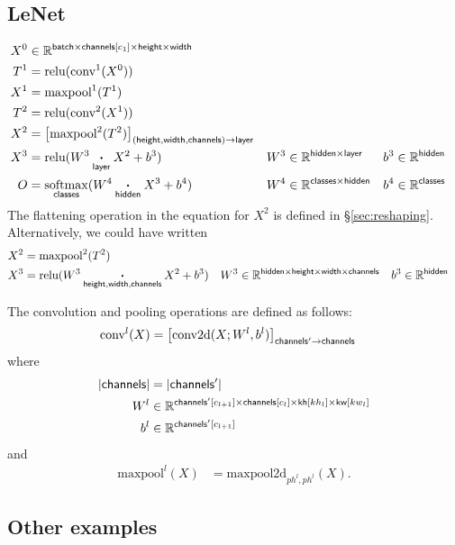 \documentclass{article}
\newcommand{\reals}{\mathbb{R}}
\begin{document}
\subsection{LeNet}

\begin{align*}
X^0 &\in \reals^{\name{batch} \times \nset{channels}{c_1} \times \name{height} \times \name{width}} \\
T^1 &= \text{relu}(\text{conv}^1(X^0)) \\
X^1 &= \text{maxpool}^1(T^1) \\
T^2 &= \text{relu}(\text{conv}^2(X^1)) \\
X^2 &= \nmov{(height,width,channels)}{layer}{\text{maxpool}^2(T^2)} \\
X^3 &= \text{relu}(W^3 \ndot{layer} X^2 + b^3) & W^3 &\in \mathbb{R}^{\name{hidden} \times \name{layer}} & b^3 &\in \mathbb{R}^{\name{hidden}} \\
O &= \nfun{classes}{softmax} (W^4 \ndot{hidden} X^3 + b^4) & W^4 &\in \mathbb{R}^{\name{classes} \times \name{hidden}} & b^4 &\in \mathbb{R}^{\name{classes}}
\end{align*}
The flattening operation in the equation for $X^2$ is defined in \S{\ref{sec:reshaping}}. Alternatively, we could have written
\begin{align*}
X^2 &= \text{maxpool}^2(T^2) \\
X^3 &= \text{relu}(W^3 \ndot{height,width,channels} X^2 + b^3) & W^3 &\in \mathbb{R}^{\name{hidden} \times \name{height} \times \name{width} \times \name{channels}} & b^3 &\in \mathbb{R}^{\name{hidden}}
\end{align*}

The convolution and pooling operations are defined as follows:
\begin{align*}
\text{conv}^l(X) &= \nmov{channels'}{channels}{\text{conv2d}(X; W^l, b^l)}
\end{align*}
where
\begin{align*}
|\name{channels}| &= |\name{channels'}| \\
W^l & \in \reals^{\nset{channels'}{c_{l+1}} \times \nset{channels}{c_l} \times \nset{kh}{kh_l} \times \nset{kw}{kw_l}} \\
b^l &\in \reals^{\nset{channels'}{c_{l+1}}}
\end{align*}
and
\begin{align*}
\text{maxpool}^l(X) &= \text{maxpool2d}_{ph^l,ph^l}(X).
\end{align*}


\subsection{Other examples}
\end{document}
